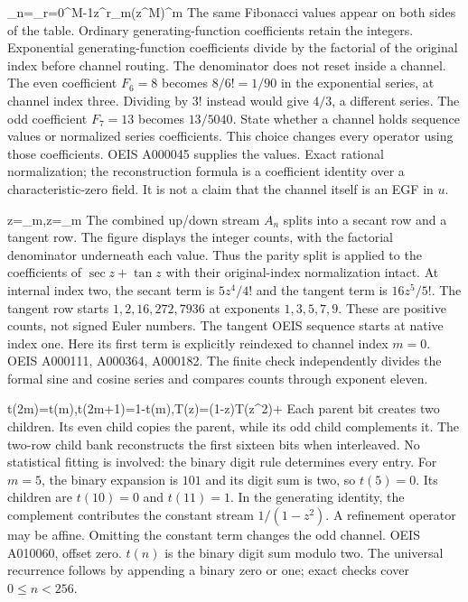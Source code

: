 {\sum_{n}=\sum_{r=0}^{M-1}z^r\sum_{m}(z^M)^m}
{The same Fibonacci values appear on both sides of the table. Ordinary generating-function coefficients retain the integers. Exponential generating-function coefficients divide by the factorial of the original index before channel routing. The denominator does not reset inside a channel.}
{The even coefficient $F_6=8$ becomes $8/6!=1/90$ in the exponential series, at channel index three. Dividing by $3!$ instead would give $4/3$, a different series. The odd coefficient $F_7=13$ becomes $13/5040$.}
{State whether a channel holds sequence values or normalized series coefficients. This choice changes every operator using those coefficients.}
{OEIS A000045 supplies the values. Exact rational normalization; the reconstruction formula is a coefficient identity over a characteristic-zero field. It is not a claim that the channel itself is an EGF in $u$.}

{\sec z=\sum_{m},\qquad \tan z=\sum_{m}}
{The combined up/down stream $A_n$ splits into a secant row and a tangent row. The figure displays the integer counts, with the factorial denominator underneath each value. Thus the parity split is applied to the coefficients of $\sec z+\tan z$ with their original-index normalization intact.}
{At internal index two, the secant term is $5z^4/4!$ and the tangent term is $16z^5/5!$. The tangent row starts $1,2,16,272,7936$ at exponents $1,3,5,7,9$. These are positive counts, not signed Euler numbers.}
{The tangent OEIS sequence starts at native index one. Here its first term is explicitly reindexed to channel index $m=0$.}
{OEIS A000111, A000364, A000182. The finite check independently divides the formal sine and cosine series and compares counts through exponent eleven.}

{t(2m)=t(m),\quad t(2m+1)=1-t(m),\quad T(z)=(1-z)T(z^2)+}
{Each parent bit creates two children. Its even child copies the parent, while its odd child complements it. The two-row child bank reconstructs the first sixteen bits when interleaved. No statistical fitting is involved: the binary digit rule determines every entry.}
{For $m=5$, the binary expansion is $101$ and its digit sum is two, so $t(5)=0$. Its children are $t(10)=0$ and $t(11)=1$. In the generating identity, the complement contributes the constant stream $1/(1-z^2)$.}
{A refinement operator may be affine. Omitting the constant term changes the odd channel.}
{OEIS A010060, offset zero. $t(n)$ is the binary digit sum modulo two. The universal recurrence follows by appending a binary zero or one; exact checks cover $0\le n<256$.}

